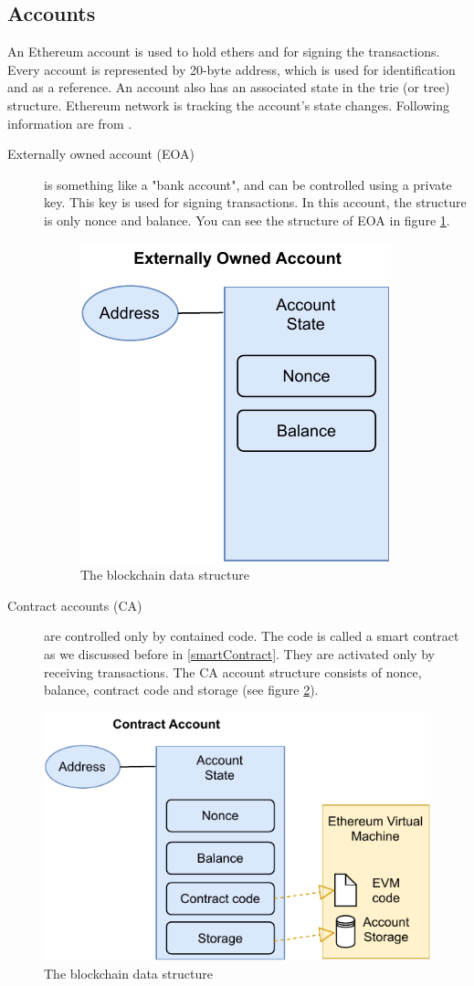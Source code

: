 \documentclass[thesis=M,english]{FITthesis}[2019/12/23]
\begin{document}
\subsection{Accounts}

An Ethereum account is used to hold ethers and for signing the transactions. Every account is represented by 20-byte address, which is used for identification and as a reference. An account also has an associated state in the trie (or tree) structure. Ethereum network is tracking the account's state changes. Following information are from \cite{learnEther}.
\begin{description}

\item[Externally owned account (EOA)] is something like a "bank account", and can be controlled using a private key. This key is used for signing transactions. In this account, the structure is only nonce and balance. You can see the structure of EOA in figure \ref{fig:EoAStructure}.

\begin{figure}[ht!]
    \centering
    \includegraphics[width=.3\textwidth]{assets/ETHEOAacc.pdf}
    \caption{The blockchain data structure \cite{Singhal2018}}
    \label{fig:EoAStructure}
\end{figure}





\item[Contract accounts (CA)] are controlled only by contained code. The code is called a smart contract as we discussed before in \ref{smartContract}. They are activated only by receiving transactions. The CA account structure consists of nonce, balance, contract code and storage (see figure \ref{fig:CAStructure}).
\end{description}

\begin{figure}[ht!]
    \centering
    \includegraphics[width=.6\textwidth]{assets/ETHCAacc.pdf}
    \caption{The blockchain data structure \cite{Singhal2018}}
    \label{fig:CAStructure}
\end{figure}
\end{document}
